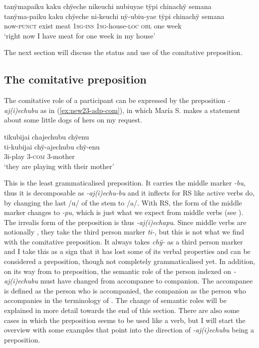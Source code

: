 \ea\label{ex:adp-keuchi-5}
\begingl
\glpreamble tanÿmapaiku kaku chÿeche nikeuchi nubiuyae tÿpi chinachÿ semana\\
\gla tanÿma-paiku kaku chÿeche ni-keuchi nÿ-ubiu-yae tÿpi chinachÿ semana\\
\glb now-\textsc{punct} exist meat 1\textsc{sg}-\textsc{ins} 1\textsc{sg}-house-\textsc{loc} \textsc{obl} one week\\
\glft ‘right now I have meat for one week in my house’
\endgl
\trailingcitation{[nxx-a630101g-1.56]}
\xe
{}

The next section will discuss the status and use of the comitative preposition.



\subsection{The comitative preposition}\label{sec:adp-ajechubu}

The comitative role of a participant can be expressed by the preposition \textit{-aj(i)echu\-bu} as in (\ref{ex:new23-adp-com}), in which María S. makes a statement about some little dogs of hers on my request.

\ea\label{ex:new23-adp-com}
\begingl
\glpreamble tikubijai chajechubu chÿenu\\
\gla ti-kubijai chÿ-ajechubu chÿ-enu\\
\glb 3i-play 3-\textsc{com} 3-mother\\
\glft ‘they are playing with their mother’
\endgl
\trailingcitation{[rxx-e181101l-1]}
\xe

This is the least grammaticalised preposition. It carries the middle marker \textit{-bu}, thus it is decomposable as \textit{-aj(i)echu-bu} and it inflects for RS like active verbs do, by changing the last /u/ of the stem to /a/. With  RS, the form of the middle marker changes to \textit{-pu}, which is just what we expect from middle verbs (see ). The irrealis form of the preposition is thus \textit{-aj(i)echapu}. Since middle verbs are notionally , they take the third person marker \textit{ti-}, but this is not what we find with the comitative preposition. It always takes \textit{chÿ-} as a third person marker and I take this as a sign that it has lost some of its verbal properties and can be considered a preposition, though not completely grammaticalised yet. In addition, on its way from  to preposition, the semantic role of the person indexed on \textit{-aj(i)echubu} must have changed from accompanee to companion. The accompanee is defined as the person who is accompanied, the companion as the person who accompanies in the terminology of \citet[]{Stolz2006}.
The change of semantic roles will be explained in more detail towards the end of this section. There are also some cases in which the preposition seems to be used like a verb, but I will start the overview with some examples that point into the direction of \textit{-aj(i)echubu} being a preposition.

